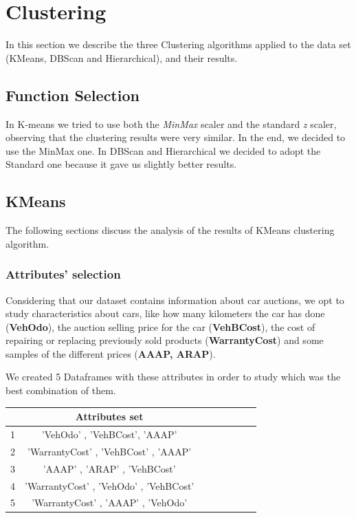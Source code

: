 \documentclass{article}
\begin{document}
	
	\newpage
	\section{Clustering}
	\label{sec:clustering}
	In this section we describe the three Clustering algorithms applied to the data set (KMeans, DBScan and Hierarchical), and their results.
	
	\subsection{Function Selection}
	In K-means we tried to use both the \emph{MinMax} scaler and the standard \emph{z} scaler, observing that the clustering results were very similar. In the end, we decided to use the MinMax one.
	In DBScan and Hierarchical we decided to adopt the Standard one because it gave us slightly better results.
	
	\subsection{KMeans}
	The following sections discuss the analysis of the results of KMeans clustering algorithm.
	
	\subsubsection{Attributes' selection}
	Considering that our dataset contains information about car auctions, we opt to study characteristics about cars, like how many kilometers the car has done (\textbf{VehOdo}), the auction selling price for the car (\textbf{VehBCost}), the cost of repairing or replacing previously sold products (\textbf{WarrantyCost}) and some samples of the different prices (\textbf{AAAP, ARAP}).
	
	We created 5 Dataframes with these attributes in order to study which was the best combination of them.
	
	\begin{table}[H]
		\centering
		\begin{tabular}{c|ccccccc}
			\hline
			& Attributes set \\
			\hline
			\rowcolor{Gray}
			1 & 'VehOdo' ,  'VehBCost',  'AAAP' \\
			2 & 'WarrantyCost' , 'VehBCost' ,  'AAAP'  \\
			\rowcolor{Gray}
			3 & 'AAAP' ,  'ARAP' ,  'VehBCost' \\
			4 & 'WarrantyCost' ,  'VehOdo' ,  'VehBCost'  \\
			\rowcolor{Gray}
			5 & 'WarrantyCost' ,  'AAAP' , 'VehOdo' \\
			\hline
		\end{tabular}
	\end{table}
	
\end{document}
